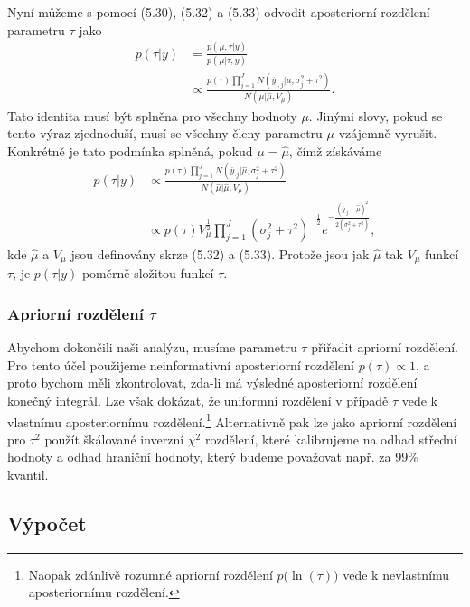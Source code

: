 Nyní můžeme s pomocí (5.30), (5.32) a (5.33) odvodit aposteriorní rozdělení parametru $\tau$ jako
\begin{equation}
\begin{split}
p(\tau | y) & = \frac{p(\mu, \tau | y)}{p(\mu | \tau, y)}\\
 & \varpropto \frac{p(\tau) \prod_{j = 1}^J N(\overline{y}_{\cdot, j} | \mu, \sigma_j^2 + \tau^2)}{N(\mu | \hat{\mu}, V_{\mu})}.
\end{split}
\end{equation}
Tato identita musí být splněna pro všechny hodnoty $\mu$. Jinými slovy, pokud se tento výraz zjednoduší, musí se všechny členy parametru $\mu$  vzájemně vyrušit. Konkrétně je tato podmínka splněná, pokud $\mu = \hat{\mu}$, čímž získáváme
\begin{equation}
\begin{split}
p(\tau | y) & \varpropto \frac{p(\tau)\prod_{j = 1}^J N(\overline{y}_{\cdot j} | \hat{\mu}, \sigma_j^2 + \tau^2)}{N(\hat{\mu} | \hat{\mu}, V_{\mu})}\\
 & \varpropto p(\tau) V_{\mu}^{\frac{1}{2}} \prod_{j = 1}^J (\sigma_j^2 + \tau^2)^{-\frac{1}{2}} e^{-\frac{(\overline{y}_{\cdot j} - \hat{\mu})^2}{2(\sigma_j^2 + \tau^2)}},
\end{split}
\end{equation}
kde $\hat{\mu}$ a $V_{\mu}$ jsou definovány skrze (5.32) a (5.33). Protože jsou jak $\hat{\mu}$ tak $V_{\mu}$ funkcí $\tau$, je $p(\tau | y)$ poměrně složitou funkcí $\tau$.

\subsubsection{Apriorní rozdělení $\tau$}

Abychom dokončili naši analýzu, musíme parametru $\tau$ přiřadit apriorní rozdělení. Pro tento účel použijeme neinformativní aposteriorní rozdělení $p(\tau) \varpropto 1$, a proto bychom měli zkontrolovat, zda-li má výsledné aposteriorní rozdělení konečný integrál. Lze však dokázat, že uniformní rozdělení v případě $\tau$ vede k vlastnímu aposteriornímu rozdělení.\footnote{Naopak zdánlivě rozumné apriorní rozdělení $p\big(\ln(\tau)\big)$ vede k nevlastnímu aposteriornímu rozdělení.} Alternativně pak lze jako apriorní rozdělení pro $\tau^2$ použít škálované inverzní $\chi^2$ rozdělení, které kalibrujeme na odhad střední hodnoty a odhad hraniční hodnoty, který budeme považovat např. za 99\% kvantil.

\subsection{Výpočet}


